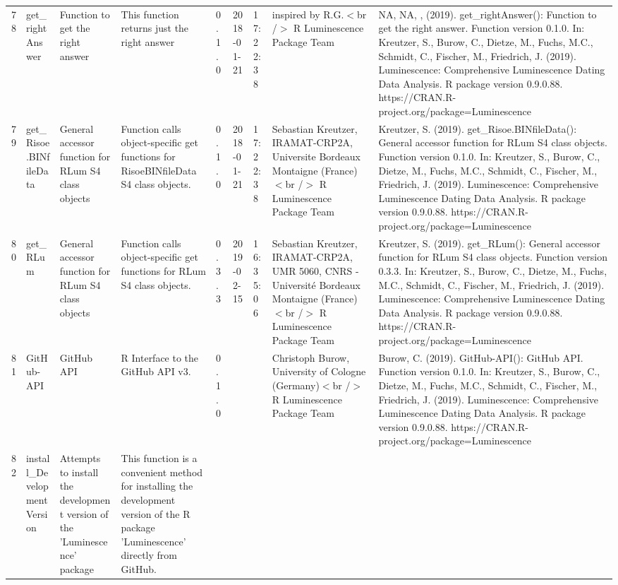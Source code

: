 \begin{table}[ht]
\begin{tabular}{rllllllll}
 \\ 
  78 & get\_rightAnswer & Function to get the right answer & This function returns just the right answer & 0.1.0 & 2018-01-21 & 17:22:38
 & inspired by R.G.$<$br /$>$  R Luminescence Package Team & NA, NA, ,  (2019). get\_rightAnswer(): Function to get the right answer. Function version 0.1.0. In: Kreutzer, S., Burow, C., Dietze, M., Fuchs, M.C., Schmidt, C., Fischer, M., Friedrich, J. (2019). Luminescence: Comprehensive Luminescence Dating Data Analysis. R package version 0.9.0.88. https://CRAN.R-project.org/package=Luminescence
 \\ 
  79 & get\_Risoe.BINfileData & General accessor function for RLum S4 class objects & Function calls object-specific get functions for RisoeBINfileData S4 class objects. & 0.1.0 & 2018-01-21 & 17:22:38
 & Sebastian Kreutzer, IRAMAT-CRP2A, Universite Bordeaux Montaigne (France)$<$br /$>$  R Luminescence Package Team & Kreutzer, S. (2019). get\_Risoe.BINfileData(): General accessor function for RLum S4 class objects. Function version 0.1.0. In: Kreutzer, S., Burow, C., Dietze, M., Fuchs, M.C., Schmidt, C., Fischer, M., Friedrich, J. (2019). Luminescence: Comprehensive Luminescence Dating Data Analysis. R package version 0.9.0.88. https://CRAN.R-project.org/package=Luminescence
 \\ 
  80 & get\_RLum & General accessor function for RLum S4 class objects & Function calls object-specific get functions for RLum S4 class objects. & 0.3.3 & 2019-02-15 & 16:35:06
 & Sebastian Kreutzer, IRAMAT-CRP2A, UMR 5060, CNRS - Université Bordeaux Montaigne (France)$<$br /$>$  R Luminescence Package Team & Kreutzer, S. (2019). get\_RLum(): General accessor function for RLum S4 class objects. Function version 0.3.3. In: Kreutzer, S., Burow, C., Dietze, M., Fuchs, M.C., Schmidt, C., Fischer, M., Friedrich, J. (2019). Luminescence: Comprehensive Luminescence Dating Data Analysis. R package version 0.9.0.88. https://CRAN.R-project.org/package=Luminescence
 \\ 
  81 & GitHub-API & GitHub API & R Interface to the GitHub API v3. & 0.1.0
 &  &  & Christoph Burow, University of Cologne (Germany)$<$br /$>$  R Luminescence Package Team & Burow, C. (2019). GitHub-API(): GitHub API. Function version 0.1.0. In: Kreutzer, S., Burow, C., Dietze, M., Fuchs, M.C., Schmidt, C., Fischer, M., Friedrich, J. (2019). Luminescence: Comprehensive Luminescence Dating Data Analysis. R package version 0.9.0.88. https://CRAN.R-project.org/package=Luminescence
 \\ 
  82 & install\_DevelopmentVersion & Attempts to install the development version of the 'Luminescence' package & This function is a convenient method for installing the development version of the R package 'Luminescence' directly from GitHub. &  &  &  &  &  \\ 

\end{tabular}
\end{table}
